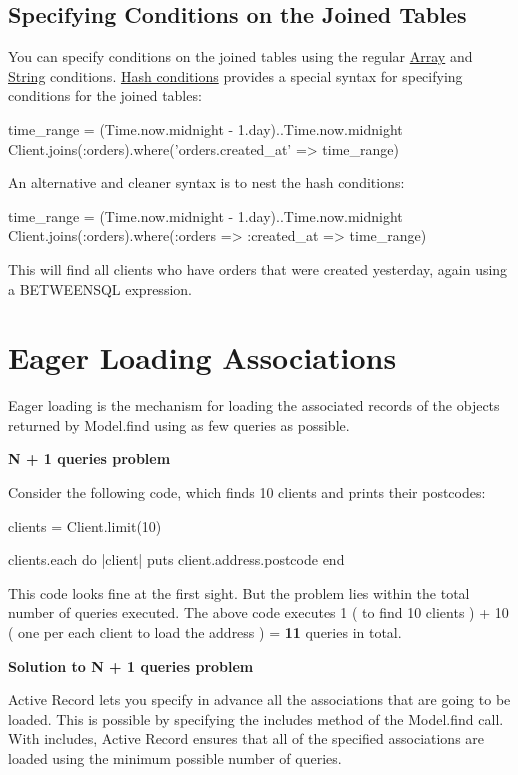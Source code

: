 \documentclass[10pt]{book}
\newenvironment{code}{%
  \scriptsize
    \verbatim
}{%
    \endverbatim
    \newline
}
\begin{document}
\subsection{ Specifying Conditions on the Joined Tables}

You can specify conditions on the joined tables using the regular \hyperlink{array-conditions}{Array} and \hyperlink{pure-string-conditions}{String} conditions. \hyperlink{hash-conditions}{Hash conditions} provides a special syntax for specifying conditions for the joined tables:
\begin{code}
time_range = (Time.now.midnight - 1.day)..Time.now.midnight
Client.joins(:orders).where('orders.created_at' => time_range)
\end{code}

An alternative and cleaner syntax is to nest the hash conditions:
\begin{code}
time_range = (Time.now.midnight - 1.day)..Time.now.midnight
Client.joins(:orders).where(:orders => {:created_at => time_range})
\end{code}

This will find all clients who have orders that were created yesterday, again using a BETWEENSQL expression.

\section{ Eager Loading Associations}

Eager loading is the mechanism for loading the associated records of the objects returned by Model.find using as few queries as possible.

\textbf{N + 1 queries problem}

Consider the following code, which finds 10 clients and prints their postcodes:
\begin{code}
clients = Client.limit(10)
 
clients.each do |client|
  puts client.address.postcode
end
\end{code}

This code looks fine at the first sight. But the problem lies within  the total number of queries executed. The above code executes 1 ( to  find 10 clients ) + 10 ( one per each client to load the address ) = \textbf{11} queries in total.

\textbf{Solution to N + 1 queries problem}

Active Record lets you specify in advance all the associations that are going to be loaded. This is possible by specifying the includes method of the Model.find call. With includes, Active Record ensures that all of the specified associations are loaded using the minimum possible number of queries.
\end{document}

